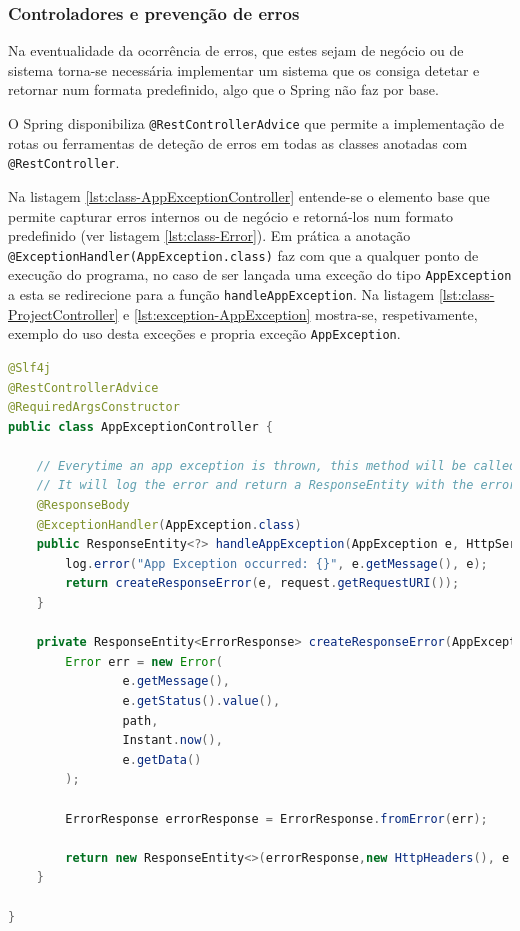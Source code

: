 \subsubsection{Controladores e prevenção de erros}

Na eventualidade da ocorrência de erros, que estes sejam de negócio ou de sistema torna-se necessária implementar um sistema que os consiga detetar e retornar num formata predefinido, algo que o \gls{Spring} não faz por base. 

O \gls{Spring} disponibiliza \lstinline|@RestControllerAdvice| que permite a implementação de rotas ou ferramentas de deteção de erros em todas as classes anotadas com \lstinline|@RestController|.

Na listagem \ref{lst:class-AppExceptionController} entende-se o elemento base que permite capturar erros internos ou de negócio e retorná-los num formato predefinido (ver listagem \ref{lst:class-Error}). Em prática a anotação \lstinline|@ExceptionHandler(AppException.class)| faz com que a qualquer ponto de execução do programa, no caso de ser lançada uma exceção do tipo \lstinline|AppException| a esta se redirecione para a função \lstinline|handleAppException|. Na listagem \ref{lst:class-ProjectController} e \ref{lst:exception-AppException} mostra-se, respetivamente, exemplo do uso desta exceções e propria exceção \lstinline|AppException|.

\begin{lstlisting}[language=Java, caption={Class \textit{AppExceptionController}}, label={lst:class-AppExceptionController}]
@Slf4j
@RestControllerAdvice
@RequiredArgsConstructor
public class AppExceptionController {

    // Everytime an app exception is thrown, this method will be called
    // It will log the error and return a ResponseEntity with the error details
    @ResponseBody
    @ExceptionHandler(AppException.class)
    public ResponseEntity<?> handleAppException(AppException e, HttpServletRequest request) {
        log.error("App Exception occurred: {}", e.getMessage(), e);
        return createResponseError(e, request.getRequestURI());
    }

    private ResponseEntity<ErrorResponse> createResponseError(AppException e, String path) {
        Error err = new Error(
                e.getMessage(),
                e.getStatus().value(),
                path,
                Instant.now(),
                e.getData()
        );

        ErrorResponse errorResponse = ErrorResponse.fromError(err);

        return new ResponseEntity<>(errorResponse,new HttpHeaders(), e.getStatus());
    }

}
\end{lstlisting}

